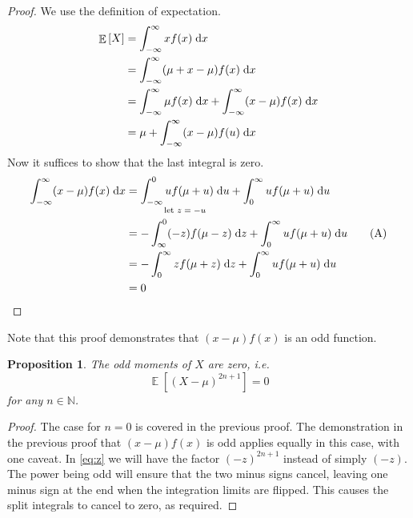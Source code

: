 \documentclass[11pt]{article}
\newtheorem{prop}{Proposition}
\theoremstyle{definition}
\theoremstyle{remark}
\newcommand{\parens}[1]{\left(#1\right)}
\renewcommand{\d}{\mathrm{d}}
\newcommand{\intd}{\;\d}
\newcommand{\infinfint}{%
    \ensuremath \int_{-\infty}^{\infty}
}
\newcommand{\intfrominf}{%
    \ensuremath \int_{-\infty}
}
\newcommand{\inttoinf}{%
    \ensuremath \int^{\infty}
}
\newcommand{\N}{\mathbb{N}}
\DeclareMathOperator{\Expect}{\mathbb{E}}
\newcommand{\E}[1]{\Expect{\left[#1\right]}}
\begin{document}
\begin{proof}
    We use the definition of expectation.
    \begin{align*}
        \E{X}
        &= \infinfint x f(x) \intd x \\
        &= \infinfint (\mu + x - \mu) f(x) \intd x \\
        &= \infinfint \mu f(x) \intd x
            + \infinfint (x - \mu) f(x) \intd x \\
        &= \mu + \infinfint (x - \mu) f(u) \intd x \\
    \end{align*}
    Now it suffices to show that the last integral is zero.
    \begin{align*}
        \infinfint (x - \mu) f(x) \intd x
        &= \underset{
            \text{let $z = -u$}
        }{
            \intfrominf^0 u f(\mu + u) \intd u
        }
            + \inttoinf_0 u f(\mu + u) \intd u
        \\
        &= - \int_\infty^0 (-z) f(\mu - z) \intd z
            + \inttoinf_0 u f(\mu + u) \intd u
        \tag{A} \label{eq:z} \\
        &= - \inttoinf_0 z f(\mu + z) \intd z
            + \inttoinf_0 u f(\mu + u) \intd u
        \\
        &= 0
    \end{align*}
\end{proof}

Note that this proof demonstrates that $(x - \mu)f(x)$ is an odd function.

\begin{prop}
    The odd moments of $X$ are zero, i.e.
    \begin{equation*}
        \E{\parens{X - \mu}^{2n + 1}} = 0
    \end{equation*}
    for any $n \in \N$.
\end{prop}

\begin{proof}
    The case for $n = 0$ is covered in the previous proof.
    The demonstration in the previous proof that $(x - \mu) f(x)$ is odd
    applies equally in this case, with one caveat.
    In \eqref{eq:z} we will have the factor $(-z)^{2n+1}$ instead of simply
    $(-z)$.
    The power being odd will ensure that the two minus signs cancel, leaving
    one minus sign at the end when the integration limits are flipped.
    This causes the split integrals to cancel to zero, as required.
\end{proof}
\end{document}
